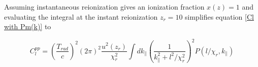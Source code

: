 \documentclass[12pt]{article}
\begin{document}


Assuming instantaneous reionization gives an ionization fraction $x(z)=1$ and evaluating the integral at the instant reionization $z_r=10$ simplifies equation \ref{Cl with Pm(k)} to

\begin{equation}\label{Cl lksz simplified}
C_l^{pp}=\left(\frac{T_{rad} }{c}\right)^2 (2\pi)^2 \frac{u^2(z_r)}{\chi^2_r} \int dk_\parallel \left(\frac{1}{k^2_\parallel+l^2/\chi^2_r}\right)^2 P(l/\chi_r,k_\parallel)
\end{equation}

\end{document}
